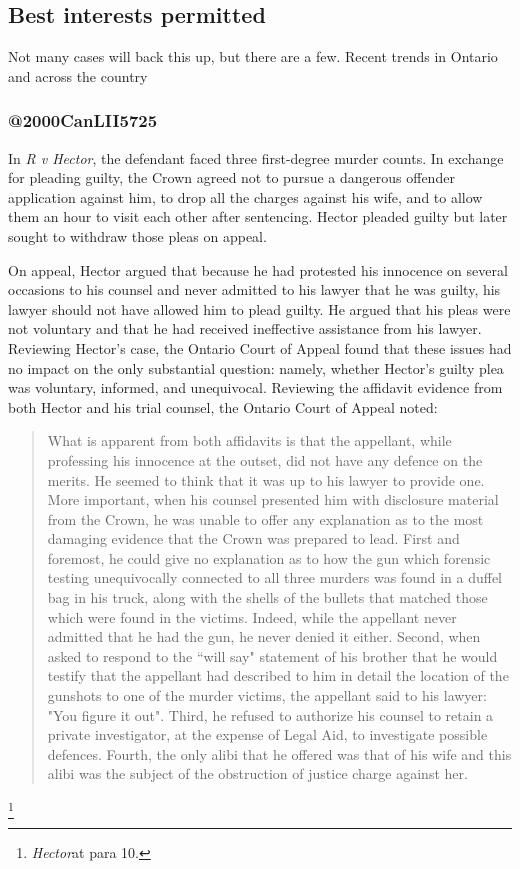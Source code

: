 \subsection{Best interests permitted}

Not many cases will back this up, but there are a few. Recent trends in Ontario and across the country 

\subsubsection{@2000CanLII5725}

In \textit{R v Hector}, the defendant faced three first-degree murder counts. In exchange for pleading guilty, the Crown agreed not to pursue a dangerous offender application against him, to drop all the charges against his wife, and to allow them an hour to visit each other after sentencing. Hector pleaded guilty but later sought to withdraw those pleas on appeal.

On appeal, Hector argued that because he had protested his innocence on several occasions to his counsel and never admitted to his lawyer that he was guilty, his lawyer should not have allowed him to plead guilty. He argued that his pleas were not voluntary and that he had received ineffective assistance from his lawyer. Reviewing Hector's case, the Ontario Court of Appeal found that these issues had no impact on the only substantial question: namely, whether Hector's guilty plea was voluntary, informed, and unequivocal. Reviewing the affidavit evidence from both Hector and his trial counsel, the Ontario Court of Appeal noted:

\begin{quote}
    What is apparent from both affidavits is that the appellant, while professing his innocence at the outset, did not have any defence on the merits. He seemed to think that it was up to his lawyer to provide one. More important, when his counsel presented him with disclosure material from the Crown, he was unable to offer any explanation as to the most damaging evidence that the Crown was prepared to lead. First and foremost, he could give no explanation as to how the gun which forensic testing unequivocally connected to all three murders was found in a duffel bag in his truck, along with the shells of the bullets that matched those which were found in the victims. Indeed, while the appellant never admitted that he had the gun, he never denied it either. Second, when asked to respond to the ``will say" statement of his brother that he would testify that the appellant had described to him in detail the location of the gunshots to one of the murder victims, the appellant said to his lawyer: "You figure it out". Third, he refused to authorize his counsel to retain a private investigator, at the expense of Legal Aid, to investigate possible defences. Fourth, the only alibi that he offered was that of his wife and this alibi was the subject of the obstruction of justice charge against her.
\end{quote}\footnote{\textit{Hector}at para 10.}

